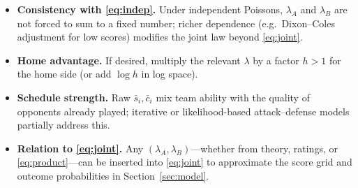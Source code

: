 \documentclass[11pt,a4paper]{article}
\begin{document}
\begin{itemize}
  \item \textbf{Consistency with \eqref{eq:indep}.}
  Under independent Poissons, $\lambda_A$ and $\lambda_B$ are not forced to sum to a fixed number; richer dependence (e.g.\ Dixon--Coles adjustment for low scores) modifies the joint law beyond \eqref{eq:joint}.

  \item \textbf{Home advantage.}
  If desired, multiply the relevant $\lambda$ by a factor $h > 1$ for the home side (or add $\log h$ in log space).

  \item \textbf{Schedule strength.}
  Raw $\bar{s}_i,\bar{c}_i$ mix team ability with the quality of opponents already played; iterative or likelihood-based attack--defense models partially address this.

  \item \textbf{Relation to \eqref{eq:joint}.}
  Any $(\lambda_A,\lambda_B)$---whether from theory, ratings, or \eqref{eq:product}---can be inserted into \eqref{eq:joint} to approximate the score grid and outcome probabilities in Section~\ref{sec:model}.
\end{itemize}
\end{document}
